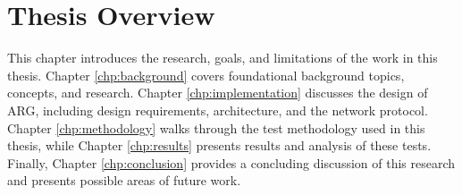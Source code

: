 \section{Thesis Overview}
\par This chapter introduces the research, goals, and limitations of the work in this thesis. Chapter \ref{chp:background} covers foundational background topics, concepts, and research. Chapter \ref{chp:implementation} discusses the design of \ac{ARG}, including design requirements, architecture, and the network protocol. Chapter \ref{chp:methodology} walks through the test methodology used in this thesis, while Chapter \ref{chp:results} presents results and analysis of these tests. Finally, Chapter \ref{chp:conclusion} provides a concluding discussion of this research and presents possible areas of future work.

